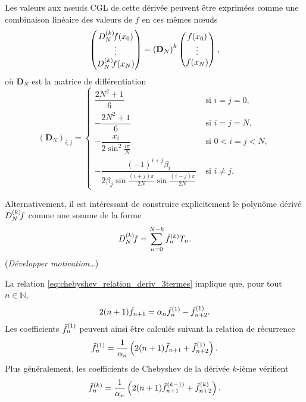 Les valeurs aux n\oe uds CGL de cette dérivée peuvent être exprimées comme une combinaison linéaire des valeurs de $f$ en ces mêmes n\oe uds
\begin{equation}
	\colvec{ 
		\interpderiv{f}{N}{k}(x_0) \\ 
		\vdots \\
		\interpderiv{f}{N}{k}(x_N)
		}
	=
	{\left( \mathbf{D}_N \right)}^k
	\colvec{ 
		f(x_0) \\ 
		\vdots \\
		f(x_N)
		},
	\label{eq:chebyshev_diff_at_cgl}
\end{equation}
où $\mathbf{D}_N$ est la matrice de différentiation \cite{canuto2006}
\def\cvsp{2.5ex}
\begin{equation}
	\left( \mathbf{D}_N \right)_{i,j} =
	\begin{cases}
	 \dfrac{2N^2 + 1}{6} & \text{\ si\ } i = j = 0,   \\[\cvsp]
	 -\dfrac{2N^2 + 1}{6} & \text{\ si\ } i = j = N,   \\[\cvsp]
	 -\dfrac{x_i}{2 \sin^2 \frac{i \pi}{N}} & \text{\ si\ } 0 < i = j < N, \\[\cvsp]
	 -\dfrac{(-1)^{i+j} \beta_i}{2 \beta_j \sin\frac{(i+j)\pi}{2N} \sin\frac{(i-j)\pi}{2N}} & \text{\ si\ } i \neq j.
	\end{cases}
	\label{eq:chebyshev_diff_matrix}
\end{equation}

Alternativement, il est intéressant de construire explicitement le polynôme dérivé $\interpderiv{f}{N}{k}$ comme une somme de la forme 
\begin{equation}
	\interpderiv{f}{N}{k} = \sum_{n=0}^{N-k} \deriv{\tilde{f}}{k}_n T_n.
\end{equation} 
(\textit{Développer motivation\ldots})

\par
La relation \eqref{eq:chebyshev_relation_deriv_3termes} implique que, pour tout $n \in \mathbb{N}$,
\begin{equation}
	2 (n + 1) \tilde{f}_{n+1} = \alpha_n \deriv{\tilde{f}}{1}_n - \deriv{\tilde{f}}{1}_{n+2}.
	\label{eq:chebyshev_prim_recurrence}
\end{equation}
Les coefficients $\deriv{\tilde{f}}{1}_n$ peuvent ainsi être calculés suivant la relation de récurrence
\begin{equation}
	\deriv{\tilde{f}}{1}_n = 
	\frac{1}{\alpha_n} \left( 2 (n + 1) \tilde{f}_{n+1} + \deriv{\tilde{f}}{1}_{n+2} \right).
	\label{eq:chebyshev_diff_recurrence}
\end{equation}
Plus généralement, les coefficients de Chebyshev de la dérivée $k$-ième vérifient
\begin{equation}
	\deriv{\tilde{f}}{k}_n = 
	\frac{1}{\alpha_n} \left( 2 (n + 1) \deriv{\tilde{f}}{k-1}_{n+1} + \deriv{\tilde{f}}{k}_{n+2} \right).
	\label{eq:chebyshev_diffp_recurrence}
\end{equation}

